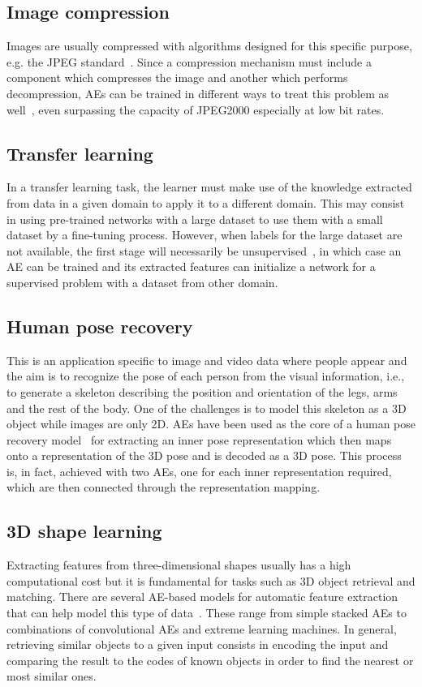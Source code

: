 \subsection{Image compression} Images are usually compressed with algorithms designed for this specific purpose, e.g. the JPEG standard~\cite{jpeg}. Since a compression mechanism must include a component which compresses the image and another which performs decompression, AEs can be trained in different ways to treat this problem as well~\cite{balle2016end,compression,cheng2018deep}, even surpassing the capacity of JPEG2000 especially at low bit rates.

\subsection{Transfer learning} In a transfer learning task, the learner must make use of the knowledge extracted from data in a given domain to apply it to a different domain. This may consist in using pre-trained networks with a large dataset to use them with a small dataset by a fine-tuning process. However, when labels for the large dataset are not available, the first stage will necessarily be unsupervised~\cite{bengio2012deep}, in which case an AE can be trained and its extracted features can initialize a network for a supervised problem with a dataset from other domain.

\subsection{Human pose recovery} This is an application specific to image and video data where people appear and the aim is to recognize the pose of each person from the visual information, i.e., to generate a skeleton describing the position and orientation of the legs, arms and the rest of the body. One of the challenges is to model this skeleton as a 3D object while images are only 2D. AEs have been used as the core of a human pose recovery model~\cite{hong2015multimodal} for extracting an inner pose representation which then maps onto a representation of the 3D pose and is decoded as a 3D pose. This process is, in fact, achieved with two AEs, one for each inner representation required, which are then connected through the representation mapping. 

\subsection{3D shape learning} Extracting features from three-dimen\-sional shapes usually has a high computational cost but it is fundamental for tasks such as 3D object retrieval and matching. There are several AE-based models for automatic feature extraction that can help model this type of data~\cite{3d1,3d2,3d3}. These range from simple stacked AEs to combinations of convolutional AEs and extreme learning machines. In general, retrieving similar objects to a given input consists in encoding the input and comparing the result to the codes of known objects in order to find the nearest or most similar ones.

